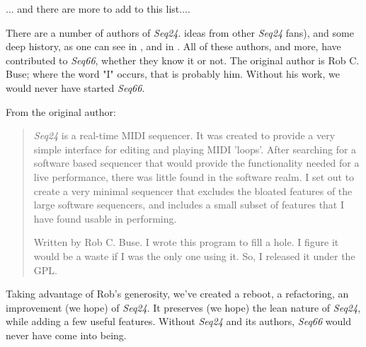    ... and there are more to add to this list....

   There are a number of authors of \textsl{Seq24}.
   ideas from other \textsl{Seq24} fans),
   and some deep history,
   as one can see in ,
   and in .
   All of these authors, and more, have contributed to \textsl{Seq66},
   whether they know it or not.
   The original author is Rob C. Buse; where the word "I" occurs, that is
   probably him.  Without his work, we would never have started
   \textsl{Seq66}.

   From the original author:

   \begin{quotation}
      \textsl{Seq24} is a real-time MIDI sequencer. It was created to
      provide a very simple interface for editing and playing MIDI 'loops'.
      After searching for a software based sequencer that would provide the
      functionality needed for a live performance, there was little found in
      the software realm. I set out to create a very minimal sequencer that
      excludes the bloated features of the large software sequencers, and
      includes a small subset of features that I have found usable in
      performing. 

      Written by Rob C. Buse.  I wrote this program to fill a
      hole.  I figure it would be a waste if I was the only one
      using it.  So, I released it under the GPL.
   \end{quotation}

   Taking advantage of Rob's generosity,
   we've created a reboot, a refactoring, an improvement (we hope) of
   \textsl{Seq24}.  It preserves (we hope) the lean nature of \textsl{Seq24},
   while adding a few useful features.
   Without \textsl{Seq24} and its authors,
   \textsl{Seq66} would never have come into being.

